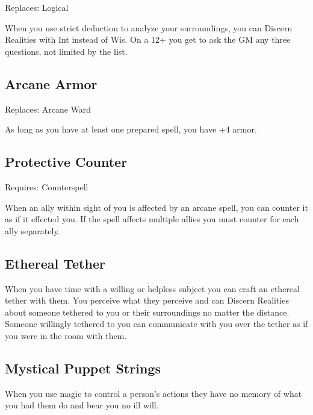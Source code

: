 Replaces: Logical

 

When you use strict deduction to analyze your surroundings, you can Discern Realities with Int instead of Wis. On a 12+ you get to ask the GM any three questions, not limited by the list.

 
\subsection{Arcane Armor}    
 

Replaces: Arcane Ward

 

As long as you have at least one prepared spell, you have +4 armor.

 
\subsection{Protective Counter}    
 

Requires: Counterspell

 

When an ally within sight of you is affected by an arcane spell, you can counter it as if it effected you. If the spell affects multiple allies you must counter for each ally separately.

 
\subsection{Ethereal Tether}    
 

When you have time with a willing or helpless subject you can craft an ethereal tether with them. You perceive what they perceive and can Discern Realities about someone tethered to you or their surroundings no matter the distance. Someone willingly tethered to you can communicate with you over the tether as if you were in the room with them.

 
\subsection{Mystical Puppet Strings}     
 

When you use magic to control a person's actions they have no memory of what you had them do and bear you no ill will.

